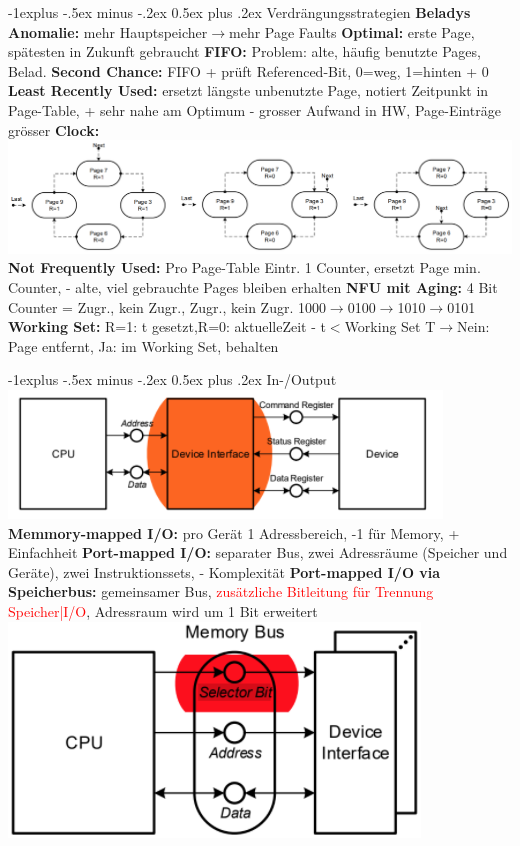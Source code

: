 \documentclass[10pt,landscape,a4paper]{article}
\makeatletter
\renewcommand{\subsection}{\@startsection{subsection}{2}{0mm}%
                                {-1explus -.5ex minus -.2ex}%
                                {0.5ex plus .2ex}%
                                {\normalfont\small\bfseries}}
\makeatother
\begin{document}
\begin{multicols*}{3}
\subsection{Verdrängungsstrategien}
\textbf{Beladys Anomalie: }mehr Hauptspeicher$\rightarrow$mehr Page Faults
\textbf{Optimal: }erste Page, spätesten in Zukunft gebraucht
\textbf{FIFO: }Problem: alte, häufig benutzte Pages, Belad.
\textbf{Second Chance: }FIFO + prüft Referenced-Bit, 0=weg, 1=hinten + 0
\textbf{Least Recently Used: }ersetzt längste unbenutzte Page, notiert Zeitpunkt in Page-Table, + sehr nahe am Optimum
- grosser Aufwand in HW, Page-Einträge grösser
\textbf{Clock: }
\includegraphics[scale = 0.3]{clock.PNG}\\
\textbf{Not Frequently Used: }Pro Page-Table Eintr. 1 Counter, ersetzt Page min. Counter, - alte, viel gebrauchte Pages bleiben erhalten
\textbf{NFU mit Aging: }4 Bit Counter = Zugr., kein Zugr., Zugr., kein Zugr. 1000$\rightarrow$0100$\rightarrow$1010$\rightarrow$0101
\textbf{Working Set: }R=1: t gesetzt,R=0: aktuelleZeit - t$<$Working Set T$\rightarrow$Nein: Page entfernt, Ja: im Working Set, behalten

\hline
\subsection{In-/Output}
\includegraphics[scale = .5]{io1.PNG}\\
\textbf{Memmory-mapped I/O: }pro Gerät 1 Adressbereich, -1 für Memory, + Einfachheit
\textbf{Port-mapped I/O: }separater Bus, zwei Adressräume (Speicher und Geräte), zwei Instruktionssets, - Komplexität
\textbf{Port-mapped I/O via Speicherbus: }gemeinsamer Bus, \textcolor{red}{zusätzliche Bitleitung für Trennung Speicher|I/O}, Adressraum wird um 1 Bit erweitert\\
\includegraphics[scale = .5]{io2.PNG}

\end{multicols*}
\end{document}

